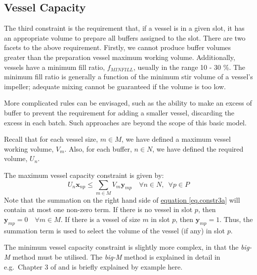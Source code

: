 \subsection{Vessel Capacity}\label{SS.constr3}

The third constraint is the requirement that, if a vessel is in a given slot,
it has an appropriate volume to prepare all buffers assigned to the slot.
There are two facets to the above requirement.
Firstly, we cannot produce buffer volumes greater than the preparation vessel
maximum working volume.
Additionally, vessels have a minimum fill ratio, $f_{MINFILL}$, usually in the
range 10 - 30 \%.
The minimum fill ratio is generally a function of the minimum stir volume of a
vessel's impeller; adequate mixing cannot be guaranteed if the volume is too
low.

More complicated rules can be envisaged, such as the ability to make an excess
of buffer to prevent the requirement for adding a smaller vessel, discarding
the excess in each batch.  Such approaches are beyond the scope of this basic
model.

Recall that for each vessel size, $m \in M$, we have defined a maximum vessel
working volume, $V_{m}$.
Also, for each buffer, $n \in N$, we have defined the required volume, $U_{n}$.

The maximum vessel capacity constraint is given by:
\begin{equation}
    U_{n} \boldsymbol{x}_{np} \le \sum_{m \in M} V_{m} \boldsymbol{y}_{mp}
    \quad \forall n \in N, \enspace \forall p \in P
    \label{eq.constr3a}
\end{equation}
Note that the summation on the right hand side of
\hyperref[eq.constr3a]{equation \ref*{eq.constr3a}} will contain at most one
non-zero term. If there is no vessel in slot $p$, then 
$\boldsymbol{y}_{mp} = 0 \quad \forall m \in M$.
If there is a vessel of size $m$ in slot $p$, then $\boldsymbol{y}_{mp} = 1$.
Thus, the summation term is used to select the volume of the vessel (if any)
in slot $p$.

The minimum vessel capacity constraint is slightly more complex, in that the
\emph{big-M} method must be utilised.
The \emph{big-M} method is explained in detail in e.g.\ Chapter 3 of 
\citet{Taha:2017} and is briefly explained by example here.

